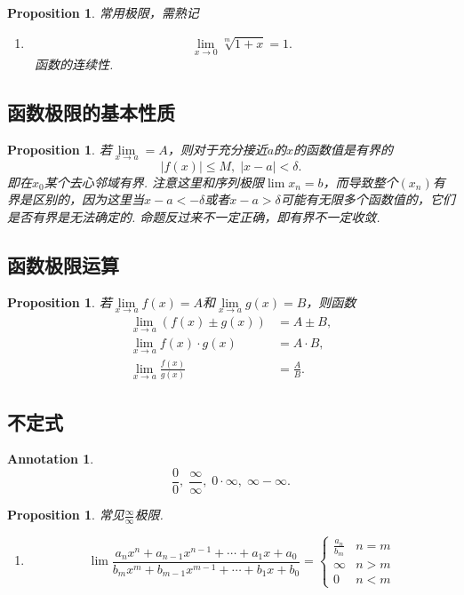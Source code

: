 \documentclass{article}
\newtheorem{proposition}[theorem]{Proposition}
\newtheorem{annotation}[theorem]{Annotation}
\newcommand{\hints}{{\color{blue} \text{hints}}}
\begin{document}
\begin{proposition}
\rm {\color{red}常用极限，需熟记}
\begin{enumerate}
	\item 
	$$
	\lim\limits_{x \rightarrow 0} \sqrt[m]{1+x} = 1.
	$$
	\hints\ 函数的连续性.
\end{enumerate}
\end{proposition}

\subsection{函数极限的基本性质}

\begin{proposition}
\rm 若$\lim\limits_{x \rightarrow a} = A$，则对于充分接近$a$的$x$的函数值是有界的
$$
|f(x)| \leq M ,\; |x-a| < \delta.
$$
即在$x_0$某个去心邻域有界. {\color{blue} 注意这里和序列极限$\lim x_n = b$，而导致整个$(x_n)$有界是区别的，因为这里当$x-a < -\delta$或者$x-a > \delta$可能有无限多个函数值的，它们是否有界是无法确定的}. {\color{red} 命题反过来不一定正确，即有界不一定收敛}.
\end{proposition}

\subsection{函数极限运算}

\begin{proposition}
\rm 若$\lim\limits_{x \rightarrow a} f(x) = A$和$\lim\limits_{x \rightarrow a} g(x) = B$，则函数
$$
\begin{array}{ll}
\lim\limits_{x \rightarrow a} (f(x) \pm  g(x)) &= A \pm B,\\
\lim\limits_{x \rightarrow a} f(x) \cdot g(x) & = A\cdot B, \\
\lim\limits_{x \rightarrow a} \frac{f(x)}{g(x)} &= \frac{A}{B}.
\end{array}
$$
\end{proposition}

\subsection{不定式}

\begin{annotation}
$$
\frac{0}{0},\; \frac{\infty}{\infty},\; 0\cdot \infty,\; \infty-\infty.
$$
\end{annotation}

\begin{proposition}
\rm {\color{red}常见$\frac{\infty}{\infty}$极限}.
\begin{enumerate}
	\item
	$$
		\lim \frac{a_nx^{n} + a_{n-1}x^{n-1} + \cdots + a_1x + a_0}{b_mx^{m} + b_{m-1}x^{m-1} + \cdots + b_1x + b_0} = \left\{ \begin{array}{ll}
		\frac{a_n}{b_m} & n=m \\
		\infty & n > m \\
		0 & n < m 
\end{array} \right.
	$$
\end{enumerate}
\end{proposition}
\end{document}
